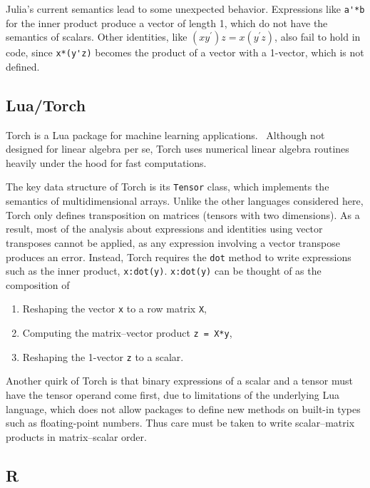 Julia's current semantics lead to some unexpected behavior. Expressions like
\verb`a'*b` for the inner product produce a vector of length 1, which do not
have the semantics of scalars. Other identities, like $(xy^\prime)z =
x(y^\prime z)$, also fail to hold in code, since \verb`x*(y'z)` becomes the
product of a vector with a 1-vector, which is not defined.


\subsection{Lua/Torch}

Torch is a Lua\cite{Lua} package for machine learning applications.~\cite{Torch}
Although not designed for linear algebra per se, Torch uses numerical linear
algebra routines heavily under the hood for fast computations.

The key data structure of Torch is its \verb`Tensor` class, which implements
the semantics of multidimensional arrays. Unlike the other languages considered
here, Torch only defines transposition on matrices (tensors with two
dimensions). As a result, most of the analysis about expressions and identities
using vector transposes cannot be applied, as any expression involving a vector
transpose produces an error.
Instead, Torch requires the \verb`dot` method to write expressions such as the inner product,
\verb`x:dot(y)`. \verb`x:dot(y)` can be thought of as the composition of
\begin{enumerate}

\item
Reshaping the vector \verb`x` to a row matrix \verb`X`,

\item
Computing the matrix--vector product \verb`z = X*y`,

\item
Reshaping the 1-vector \verb`z` to a scalar.

\end{enumerate}

Another quirk of Torch is that binary expressions of a scalar and a tensor must
have the tensor operand come first, due to limitations of the underlying Lua
language, which does not allow packages to define new methods on built-in
types such as floating-point numbers. Thus care must be taken to write
scalar--matrix products in matrix--scalar order.


\subsection{R}

